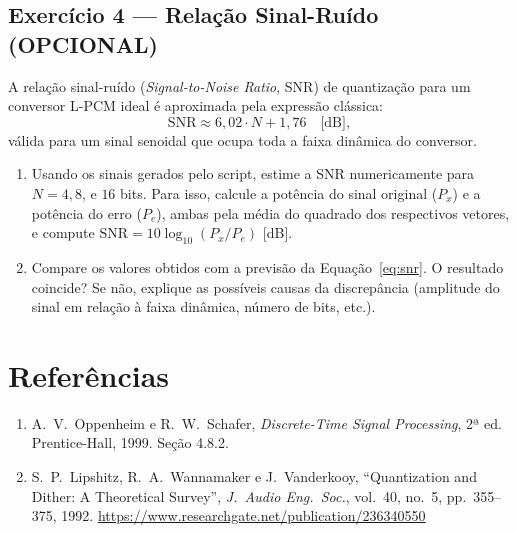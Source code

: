 \documentclass[a4paper,twoside,12pt]{article}
\begin{document}
	\subsection{Exercício 4 — Relação Sinal-Ruído (OPCIONAL)}
	\label{sec:ex4}
	
	A relação sinal-ruído (\textit{Signal-to-Noise Ratio}, SNR) de quantização para um conversor L-PCM ideal é aproximada pela expressão clássica:
	\begin{equation}
		\text{SNR} \approx 6,02 \cdot N + 1,76 \quad \text{[dB]},
		\label{eq:snr}
	\end{equation}
	válida para um sinal senoidal que ocupa toda a faixa dinâmica do conversor.
	
	\begin{enumerate}
		\item Usando os sinais gerados pelo script, estime a SNR numericamente para $N = 4, 8$, e $16$ bits. Para isso, calcule a potência do sinal original ($P_x$) e a potência do erro ($P_e$), ambas pela média do quadrado dos respectivos vetores, e compute $\text{SNR} = 10\log_{10}(P_x / P_e)$ [dB].
		
		\item Compare os valores obtidos com a previsão da Equação~\eqref{eq:snr}. O resultado coincide? Se não, explique as possíveis causas da discrepância (amplitude do sinal em relação à faixa dinâmica, número de bits, etc.).
		
	\end{enumerate}
	
	\section{Referências}
	
	\begin{enumerate}
		\item A.~V.~Oppenheim e R.~W.~Schafer, \textit{Discrete-Time Signal
			Processing}, 2ª ed. Prentice-Hall, 1999. Seção 4.8.2.
		
		\item S.~P.~Lipshitz, R.~A.~Wannamaker e J.~Vanderkooy,
		``Quantization and Dither: A Theoretical Survey'', \textit{J.\
			Audio Eng.\ Soc.}, vol.~40, no.~5, pp.~355--375, 1992.
		\url{https://www.researchgate.net/publication/236340550}
	\end{enumerate}
\end{document}

